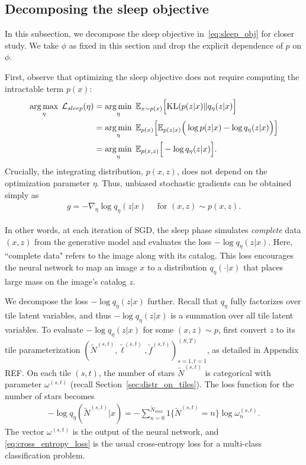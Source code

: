 \subsection{Decomposing the sleep objective}
\label{sec:sleep_details}
In this subsection, we decompose the sleep objective in~\eqref{eq:sleep_obj} for closer study. 
We take $\phi$ as fixed in this section and drop the explicit dependence of $p$ on $\phi$.

First, observe that optimizing the sleep objective does not require computing the intractable term $p(x)$:
\begin{align}
\operatorname*{arg\,max}_\eta\; \mathcal{L}_{sleep}(\eta)
    & = \operatorname*{arg\,min}_{\eta} \; \mathbb{E}_{x \sim p(x)}\Big[ \mathrm{KL}(p(z | x) \| q_\eta(z | x)\Big] \\
  &=\operatorname*{arg\,min}_{\eta} \; \mathbb E_{p(x)}\Big[\mathbb E_{p(z | x)}\Big(\log p(z | x) - \log q_\eta(z | x) \Big)\Big]\\
&=\operatorname*{arg\,min}_{\eta} \; \mathbb E_{p(x, z)}\Big[- \log q_\eta(z | x) \Big]\label{eq:sleep_loss_simple}.
\end{align}
Crucially, the integrating distribution, $p(x,z)$, does not depend on the optimization parameter $\eta$.
Thus, unbiased stochastic gradients can be obtained simply as 
\begin{align}
    g = -\nabla_\eta \log q_\eta(z | x) \quad \text{ for } (x, z)\sim p(x, z).
\end{align}

In other words, at each iteration of SGD, the sleep phase simulates {\itshape complete} data $(x,z)$ from the generative model and evaluates the loss $-\log q_\eta(z | x)$. 
Here, ``complete data" refers to the image along with its catalog. 
This loss encourages the neural network to map an image $x$ to a distribution $q_{\eta}(\cdot | x)$ that places large mass on the image's catalog $z$.

We decompose the loss $-\log q_\eta(z | x)$ further. 
Recall that $q_\eta$ fully factorizes over tile latent variables, and thus $-\log q_\eta(z | x)$ is a summation over all tile latent variables. 
To evaluate $-\log q_\eta(z | x)$ for some $(x,z)\sim p$, first convert $z$ to its tile parameterization $(\tilde N^{(s,t)}, \tilde \ell^{(s,t)}, \tilde f^{(s,t)})_{s=1,t=1}^{(S,T)}$, as detailed in Appendix REF.
On each tile $(s,t)$, the number of stars $\tilde N^{(s,t)}$ is categorical with parameter $\omega^{(s,t)}$ (recall Section~\ref{sec:distr_on_tiles}).
The loss function for the number of stars becomes
\begin{align}
    - \log q_\eta(\tilde N^{(s,t)} | x) = -\sum_{n = 0}^{\tilde N_{max}} 1\{\tilde N^{(s,t)} = n\} \log \omega^{(s,t)}_n.
    \label{eq:cross_entropy_loss}
\end{align}
The vector $\omega^{(s,t)}$ is the output of the neural network, and \eqref{eq:cross_entropy_loss} is the usual cross-entropy loss for a multi-class classification problem. 

